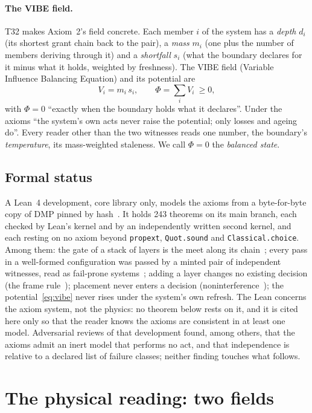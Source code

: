 \documentclass[11pt,a4paper]{article}
\theoremstyle{definition}
\theoremstyle{remark}
\theoremstyle{definition}
\begin{document}
\paragraph{The VIBE field.} T32 makes Axiom~2's field concrete. Each member $i$ of the system has a \emph{depth} $d_i$ (its shortest grant
chain back to the pair), a \emph{mass} $m_i$ (one plus the number of members deriving through it) and a \emph{shortfall} $s_i$ (what the
boundary declares for it minus what it holds, weighted by freshness). The VIBE field (Variable Influence Balancing Equation) and its
potential are
\begin{equation}\label{eq:vibe}
V_i=m_i\,s_i,\qquad \Phi=\sum_iV_i\ \ge 0,
\end{equation}
with $\Phi=0$ ``exactly when the boundary holds what it declares''. Under the axioms ``the system's own acts never raise the potential;
only losses and ageing do''. Every reader other than the two witnesses reads one number, the boundary's \emph{temperature}, its
mass-weighted staleness. We call $\Phi=0$ the \emph{balanced state}.

\subsection{Formal status}

A Lean~4 development, core library only, models the axioms from a byte-for-byte copy of DMP pinned by hash~\cite{lean4}. It holds 243
theorems on its main branch, each checked by Lean's kernel and by an independently written second kernel, and each resting on no axiom
beyond \texttt{propext}, \texttt{Quot.sound} and \texttt{Classical.choice}. Among them: the gate of a stack of layers is the meet along its
chain~\cite{denning}; every pass in a well-formed configuration was passed by a minted pair of independent witnesses, read as fail-prone
systems~\cite{mr}; adding a layer changes no existing decision (the frame rule~\cite{ohearn}); placement never enters a decision
(noninterference~\cite{gm}); the potential~\eqref{eq:vibe} never rises under the system's own refresh. The Lean concerns the axiom system,
not the physics: no theorem below rests on it, and it is cited here only so that the reader knows the axioms are consistent in at least one
model. Adversarial reviews of that development found, among others, that the axioms admit an inert model that performs no act, and that
independence is relative to a declared list of failure classes; neither finding touches what follows.

\section{The physical reading: two fields}\label{sec:fields}
\end{document}
